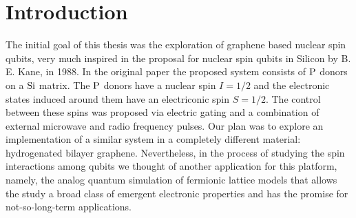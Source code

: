 \chapter{Introduction}
\label{ch:introduction}


The initial goal of this thesis was the exploration of graphene based nuclear spin qubits, very much inspired in the proposal for nuclear spin qubits in Silicon by B. E. Kane\cite{Kane1988}, in 1988.
In the original paper the proposed system consists of $\ce{P}$ donors on a $\ce{Si}$ matrix. The $\ce{P}$ donors have a nuclear spin $I=1/2$ and the electronic states induced around them have an electriconic spin $S=1/2$.
The control between these spins was proposed via electric gating and a combination of external microwave and radio frequency pulses.
Our plan was to explore an implementation of a similar system in a completely different material: hydrogenated bilayer graphene.
Nevertheless, in the process of studying the spin interactions among qubits we thought of another application for this platform, namely, the analog quantum simulation of fermionic lattice models that allows the study a broad class of emergent electronic properties and has the promise for not-so-long-term applications.
\medskip



